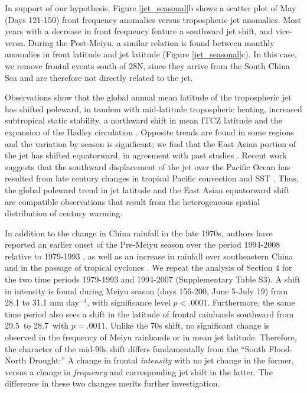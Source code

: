 \documentclass[draft,grl]{AGUTeX}
\begin{document}
\begin{article}
	In support of our hypothesis, Figure \ref{jet_seasonal}b shows a scatter plot of May (Days 121-150) front frequency anomalies versus tropospheric jet anomalies. Most years with a decrease in front frequency feature a southward jet shift, and vice-versa. During the Post-Meiyu, a similar relation is found between monthly anomalies in front latitude and jet latitude (Figure \ref{jet_seasonal}c). In this case, we remove frontal events south of 28\textdegree N, since they arrive from the South China Sea \citep{Day2015} and are therefore not directly related to the jet.

{\color{blue} 
	 Observations show that the global annual mean latitude of the tropospheric jet has shifted poleward, in tandem with mid-latitude tropospheric heating, increased subtropical static stability, a northward shift in mean ITCZ latitude and the expansion of the Hadley circulation \citep{Fu2006,Archer2008,Fu2011}. Opposite trends are found in some regions and the variation by season is significant;  we find that the East Asian portion of the jet has shifted equatorward, in agreement with past studies \citep{Yu2007, Archer2008}. Recent work suggests that the southward displacement of the jet over the Pacific Ocean has resulted from late  century changes in tropical Pacific convection and SST \citep{Park2014a}. Thus, the global poleward trend in jet latitude and the East Asian equatorward shift are compatible observations that result from the heterogeneous spatial distribution of  century warming.
	 
	 In addition to the change in China rainfall in the late 1970s, authors have reported an earlier onset of the Pre-Meiyu season over the period 1994-2008 relative to 1979-1993 \citep{Kajikawa2012}, as well as an increase in rainfall over southeastern China and in the passage of tropical cyclones \citep{Kwon2007,Chang2014}. We repeat the analysis of Section 4 for the two time periods 1979-1993 and 1994-2007 (Supplementary Table S3). A shift in intensity is found during Meiyu season (days 156-200, June 5-July 19) from 28.1 to 31.1 mm day$^{-1}$, with significance level $p<.0001$. Furthermore, the same time period also sees a shift in the latitude of frontal rainbands southward from 29.5\textdegree\ to 28.7\textdegree\ with $p=.0011$. Unlike the 70s shift, no significant change is observed in the frequency of Meiyu rainbands or in mean jet latitude. Therefore, the character of the mid-90s shift differs fundamentally from the ``South Flood-North Drought:'' A change in frontal \textit{intensity} with no jet change in the former, versus a change in \textit{frequency} and corresponding jet shift in the latter. The difference in these two changes merits further investigation.
}
		

\end{article}
\end{document}
